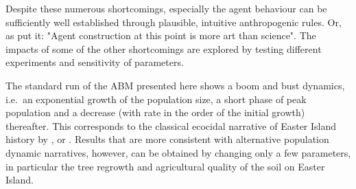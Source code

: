 Despite these numerous shortcomings, especially the agent behaviour can be sufficiently well established through plausible, intuitive anthropogenic rules.
Or, as \citet{Kohler2000} put it: "Agent construction at this point is more art than science".
The impacts of some of the other shortcomings are explored by testing different experiments and sensitivity of parameters.

The standard run of the ABM presented here shows a boom and bust dynamics, i.e.\ an exponential growth of the population size, a short phase of peak population and a decrease (with rate in the order of the initial growth) thereafter.
This corresponds to the classical ecocidal narrative of Easter Island history by \citet{Brander1998}, \citet{Diamond2011} or \citet{Bahn2017}.
Results that are more consistent with alternative population dynamic narratives, however, can be obtained by changing only a few parameters, in particular the tree regrowth and agricultural quality of the soil on Easter Island.



